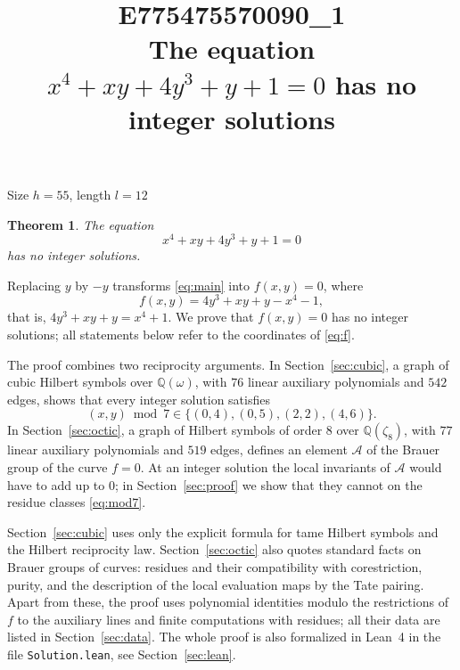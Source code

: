 \documentclass[11pt]{article}
\title{\textbf{E775475570090\_1}\\[4pt] {\Large The equation $x^{4}+xy+4y^{3}+y+1=0$ has no integer solutions}}
\author{}
\date{}
\newtheorem{theorem}{Theorem}
\newcommand{\Q}{\mathbb{Q}}
\begin{document}
\maketitle
\vspace{-8ex}
\begin{center}
Size $h=55$, length $l=12$
\end{center}

\begin{theorem}\label{thm:main}
The equation
\begin{equation}\label{eq:main}
x^{4}+xy+4y^{3}+y+1=0
\end{equation}
has no integer solutions.
\end{theorem}

Replacing $y$ by $-y$ transforms \eqref{eq:main} into $f(x,y)=0$, where
\begin{equation}\label{eq:f}
f(x,y)=4y^3+xy+y-x^4-1,
\end{equation}
that is, $4y^3+xy+y=x^4+1$. We prove that $f(x,y)=0$ has no integer solutions; all statements below refer to the coordinates of \eqref{eq:f}.

The proof combines two reciprocity arguments. In Section~\ref{sec:cubic}, a graph of cubic Hilbert symbols over $\Q(\omega)$, with $76$ linear auxiliary polynomials and $542$ edges, shows that every integer solution satisfies
\begin{equation}\label{eq:mod7}
(x,y)\bmod 7\in\{(0,4),(0,5),(2,2),(4,6)\}.
\end{equation}
In Section~\ref{sec:octic}, a graph of Hilbert symbols of order $8$ over $\Q(\zeta_8)$, with $77$ linear auxiliary polynomials and $519$ edges, defines an element $\mathcal A$ of the Brauer group of the curve $f=0$. At an integer solution the local invariants of $\mathcal A$ would have to add up to $0$; in Section~\ref{sec:proof} we show that they cannot on the residue classes \eqref{eq:mod7}.

Section~\ref{sec:cubic} uses only the explicit formula for tame Hilbert symbols and the Hilbert reciprocity law. Section~\ref{sec:octic} also quotes standard facts on Brauer groups of curves: residues and their compatibility with corestriction, purity, and the description of the local evaluation maps by the Tate pairing. Apart from these, the proof uses polynomial identities modulo the restrictions of $f$ to the auxiliary lines and finite computations with residues; all their data are listed in Section~\ref{sec:data}. The whole proof is also formalized in Lean~4 in the file \texttt{Solution.lean}, see Section~\ref{sec:lean}.
\end{document}
